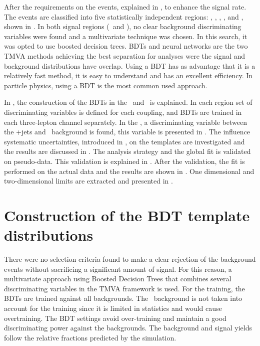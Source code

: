After the requirements on the events, explained in , to enhance the signal rate. The events are classified into five statistically independent regions: \STSR, \TTSR, \WZCR, \STCR, and \TTCR, shown in . In both signal regions (\STSR\ and \TTSR), no clear background discriminating variables were found and a multivariate technique was chosen. In this search, it was opted to use boosted decision trees. BDTs and neural networks are the two TMVA methods achieving the best separation for analyses were the signal and background distributions have overlap. Using a BDT has as advantage that it is a relatively fast method, it is easy to understand and has an excellent efficiency. In particle physics, using a  BDT is the most common used approach. 

In , the construction of the BDTs in the \STSR\ and \TTSR\ is explained. In each region set of discriminating variables is defined for each coupling, and BDTs are trained in each three-lepton channel separately. In the \WZCR, a discriminating variable between the \WZ+jets and \NPL\ background is found, this variable is presented in . The influence systematic uncertainties, introduced in , on the templates are investigated and the results are discussed in . The analysis strategy and the global fit is validated on pseudo-data. This validation is explained in . After the validation, the fit is performed on the actual data and the results are shown in . One dimensional and two-dimensional limits are extracted and presented in .


\section{Construction of the BDT template distributions}
\label{sec:templates}
There were no selection criteria found to make a clear rejection of the background events without sacrificing a significant amount of signal. For this reason, a multivariate approach using Boosted Decision Trees that combines several discriminating variables in the TMVA framework is used. For the training, the BDTs are trained against all backgrounds.  The \NPL\ background is not taken into account for the training since it is limited in statistics and would cause overtraining. The BDT settings  avoid over-training and  maintain a good discriminating power against the backgrounds. The background and signal yields follow the relative fractions predicted by the simulation. 


